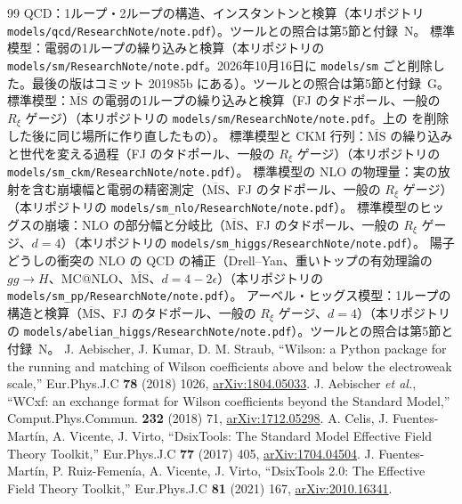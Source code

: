 \documentclass[a4paper,10pt]{ltjsarticle}
\begin{document}
\begin{thebibliography}{99}
 QCD：1ループ・2ループの構造、インスタントンと検算（本リポジトリ \nolinkurl{models/qcd/ResearchNote/note.pdf}）。ツールとの照合は第5節と付録~N。
 標準模型：電弱の1ループの繰り込みと検算（本リポジトリの \nolinkurl{models/sm/ResearchNote/note.pdf}。2026年10月16日に \nolinkurl{models/sm} ごと削除した。最後の版はコミット 201985b にある）。ツールとの照合は第5節と付録~G。
 標準模型：$\overline{\mathrm{MS}}$ の電弱の1ループの繰り込みと検算（FJ のタドポール、一般の $R_\xi$ ゲージ）（本リポジトリの \nolinkurl{models/sm/ResearchNote/note.pdf}。上の \cite{smnote} を削除した後に同じ場所に作り直したもの）。
 標準模型と CKM 行列：$\overline{\mathrm{MS}}$ の繰り込みと世代を変える過程（FJ のタドポール、一般の $R_\xi$ ゲージ）（本リポジトリの \nolinkurl{models/sm_ckm/ResearchNote/note.pdf}）。
 標準模型の NLO の物理量：実の放射を含む崩壊幅と電弱の精密測定（$\overline{\mathrm{MS}}$、FJ のタドポール、一般の $R_\xi$ ゲージ）（本リポジトリの \nolinkurl{models/sm_nlo/ResearchNote/note.pdf}）。
 標準模型のヒッグスの崩壊：NLO の部分幅と分岐比（$\overline{\mathrm{MS}}$、FJ のタドポール、一般の $R_\xi$ ゲージ、$d=4$）（本リポジトリの \nolinkurl{models/sm_higgs/ResearchNote/note.pdf}）。
 陽子どうしの衝突の NLO の QCD の補正（Drell--Yan、重いトップの有効理論の $gg\to H$、MC@NLO、$\overline{\mathrm{MS}}$、$d=4-2\epsilon$）（本リポジトリの \nolinkurl{models/sm_pp/ResearchNote/note.pdf}）。
 アーベル・ヒッグス模型：1ループの構造と検算（$\overline{\mathrm{MS}}$、FJ のタドポール、一般の $R_\xi$ ゲージ、$d=4$）（本リポジトリの \nolinkurl{models/abelian_higgs/ResearchNote/note.pdf}）。ツールとの照合は第5節と付録~N。
 J. Aebischer, J. Kumar, D. M. Straub, ``Wilson: a Python package for the running and matching of Wilson coefficients above and below the electroweak scale,'' Eur.Phys.J.C \textbf{78} (2018) 1026, \href{https://arxiv.org/abs/1804.05033}{arXiv:1804.05033}.
 J. Aebischer \textit{et al.}, ``WCxf: an exchange format for Wilson coefficients beyond the Standard Model,'' Comput.Phys.Commun. \textbf{232} (2018) 71, \href{https://arxiv.org/abs/1712.05298}{arXiv:1712.05298}.
 A. Celis, J. Fuentes-Mart\'in, A. Vicente, J. Virto, ``DsixTools: The Standard Model Effective Field Theory Toolkit,'' Eur.Phys.J.C \textbf{77} (2017) 405, \href{https://arxiv.org/abs/1704.04504}{arXiv:1704.04504}.
 J. Fuentes-Mart\'in, P. Ruiz-Femen\'ia, A. Vicente, J. Virto, ``DsixTools 2.0: The Effective Field Theory Toolkit,'' Eur.Phys.J.C \textbf{81} (2021) 167, \href{https://arxiv.org/abs/2010.16341}{arXiv:2010.16341}.

\end{thebibliography}
\end{document}

